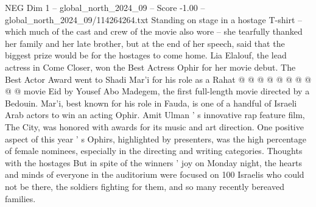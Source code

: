 \begin{textsample}{NEG Dim 1 – global\_north\_2024\_09 – Score -1.00 – global\_north\_2024\_09/114264264.txt}
Standing on stage in a hostage T-shirt -- which much of the cast and crew of the movie also wore -- she tearfully thanked her family and her late brother, but at the end of her speech, said that the biggest prize would be for the hostages to come home.
Lia Elalouf, the lead actress in Come Closer, won the Best Actress Ophir for her movie debut.
The Best Actor Award went to Shadi Mar'i for his role as a Rahat @ @ @ @ @ @ @ @ @ @ movie Eid by Yousef Abo Madegem, the first full-length movie directed by a Bedouin.
Mar'i, best known for his role in Fauda, is one of a handful of Israeli Arab actors to win an acting Ophir.
Amit Ulman ' s innovative rap feature film, The City, was honored with awards for its music and art direction.
One positive aspect of this year ' s Ophirs, highlighted by presenters, was the high percentage of female nominees, especially in the directing and writing categories.
Thoughts with the hostages But in spite of the winners ' joy on Monday night, the hearts and minds of everyone in the auditorium were focused on 100 Israelis who could not be there, the soldiers fighting for them, and so many recently bereaved families.

\end{textsample}
